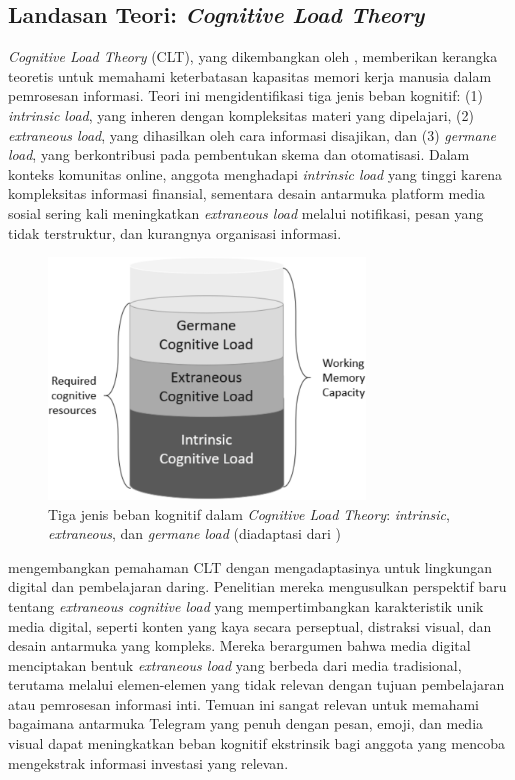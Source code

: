 \subsection{Landasan Teori: \textit{Cognitive Load Theory}}

\textit{Cognitive Load Theory} (CLT), yang dikembangkan oleh \textcite{sweller1988}, memberikan kerangka teoretis untuk memahami keterbatasan kapasitas memori kerja manusia dalam pemrosesan informasi. Teori ini mengidentifikasi tiga jenis beban kognitif: (1) \textit{intrinsic load}, yang inheren dengan kompleksitas materi yang dipelajari, (2) \textit{extraneous load}, yang dihasilkan oleh cara informasi disajikan, dan (3) \textit{germane load}, yang berkontribusi pada pembentukan skema dan otomatisasi. Dalam konteks komunitas online, anggota menghadapi \textit{intrinsic load} yang tinggi karena kompleksitas informasi finansial, sementara desain antarmuka platform media sosial sering kali meningkatkan \textit{extraneous load} melalui notifikasi, pesan yang tidak terstruktur, dan kurangnya organisasi informasi.

\begin{figure}[H]
  \centering
  \includegraphics[width=0.75\textwidth]{image/cognitive-load-theory.png}
  \caption{Tiga jenis beban kognitif dalam \textit{Cognitive Load Theory}: \textit{intrinsic}, \textit{extraneous}, dan \textit{germane load} (diadaptasi dari \textcite{sweller1988})}
  \label{fig:cognitive-load}
\end{figure}

\textcite{skulmowski2022} mengembangkan pemahaman CLT dengan mengadaptasinya untuk lingkungan digital dan pembelajaran daring. Penelitian mereka mengusulkan perspektif baru tentang \textit{extraneous cognitive load} yang mempertimbangkan karakteristik unik media digital, seperti konten yang kaya secara perseptual, distraksi visual, dan desain antarmuka yang kompleks. Mereka berargumen bahwa media digital menciptakan bentuk \textit{extraneous load} yang berbeda dari media tradisional, terutama melalui elemen-elemen yang tidak relevan dengan tujuan pembelajaran atau pemrosesan informasi inti. Temuan ini sangat relevan untuk memahami bagaimana antarmuka Telegram yang penuh dengan pesan, emoji, dan media visual dapat meningkatkan beban kognitif ekstrinsik bagi anggota yang mencoba mengekstrak informasi investasi yang relevan.

